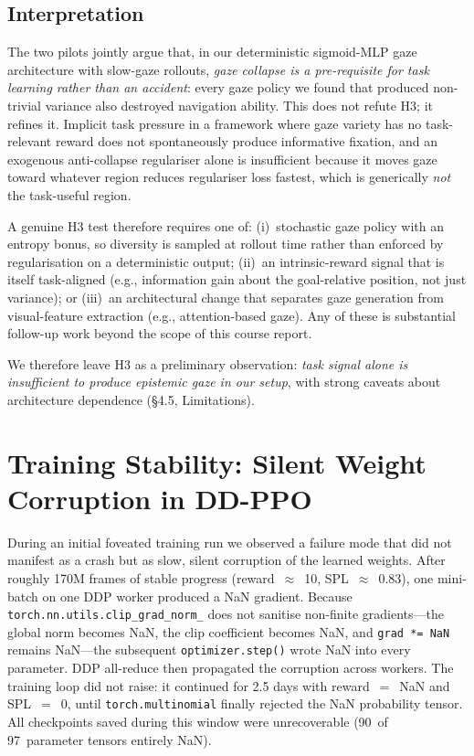 \documentclass[10pt,conference,compsocconf]{IEEEtran}
\begin{document}
\subsection*{Interpretation}

The two pilots jointly argue that, in our deterministic sigmoid-MLP gaze architecture with slow-gaze rollouts, \emph{gaze collapse is a pre-requisite for task learning rather than an accident}: every gaze policy we found that produced non-trivial variance also destroyed navigation ability. This does not refute H3; it refines it. Implicit task pressure in a framework where gaze variety has no task-relevant reward does not spontaneously produce informative fixation, and an exogenous anti-collapse regulariser alone is insufficient because it moves gaze toward whatever region reduces regulariser loss fastest, which is generically \emph{not} the task-useful region.

A genuine H3 test therefore requires one of: (i)~stochastic gaze policy with an entropy bonus, so diversity is sampled at rollout time rather than enforced by regularisation on a deterministic output; (ii)~an intrinsic-reward signal that is itself task-aligned (e.g., information gain about the goal-relative position, not just variance); or (iii)~an architectural change that separates gaze generation from visual-feature extraction (e.g., attention-based gaze). Any of these is substantial follow-up work beyond the scope of this course report.

We therefore leave H3 as a preliminary observation: \emph{task signal alone is insufficient to produce epistemic gaze in our setup}, with strong caveats about architecture dependence (§4.5, Limitations).

\section{Training Stability: Silent Weight Corruption in DD-PPO}
\label{app:training-stability}

During an initial foveated training run we observed a failure mode that did not manifest as a crash but as slow, silent corruption of the learned weights. After roughly 170M frames of stable progress (reward~$\approx$~10, SPL~$\approx$~0.83), one mini-batch on one DDP worker produced a NaN gradient. Because \texttt{torch.nn.utils.clip\_grad\_norm\_} does not sanitise non-finite gradients---the global norm becomes NaN, the clip coefficient becomes NaN, and \texttt{grad *= NaN} remains NaN---the subsequent \texttt{optimizer.step()} wrote NaN into every parameter. DDP all-reduce then propagated the corruption across workers. The training loop did not raise: it continued for 2.5 days with reward~$=$~NaN and SPL~$=$~0, until \texttt{torch.multinomial} finally rejected the NaN probability tensor. All checkpoints saved during this window were unrecoverable (90~of 97~parameter tensors entirely NaN).
\end{document}
